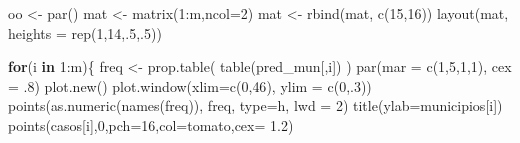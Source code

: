 \documentclass[
  letterpaper,
  DIV=11,
  numbers=noendperiod]{scrreprt}
\newenvironment{Shaded}{\begin{snugshade}}{\end{snugshade}}
\newcommand{\AttributeTok}[1]{\textcolor[rgb]{0.40,0.45,0.13}{#1}}
\newcommand{\ControlFlowTok}[1]{\textcolor[rgb]{0.00,0.23,0.31}{\textbf{#1}}}
\newcommand{\DecValTok}[1]{\textcolor[rgb]{0.68,0.00,0.00}{#1}}
\newcommand{\FloatTok}[1]{\textcolor[rgb]{0.68,0.00,0.00}{#1}}
\newcommand{\FunctionTok}[1]{\textcolor[rgb]{0.28,0.35,0.67}{#1}}
\newcommand{\NormalTok}[1]{\textcolor[rgb]{0.00,0.23,0.31}{#1}}
\newcommand{\OtherTok}[1]{\textcolor[rgb]{0.00,0.23,0.31}{#1}}
\newcommand{\SpecialCharTok}[1]{\textcolor[rgb]{0.37,0.37,0.37}{#1}}
\newcommand{\StringTok}[1]{\textcolor[rgb]{0.13,0.47,0.30}{#1}}
\theoremstyle{definition}
\theoremstyle{definition}
\theoremstyle{plain}
\theoremstyle{remark}
\begin{document}
\begin{Shaded}
\begin{Highlighting}[]
\NormalTok{oo }\OtherTok{\textless{}{-}} \FunctionTok{par}\NormalTok{()}
\NormalTok{mat }\OtherTok{\textless{}{-}} \FunctionTok{matrix}\NormalTok{(}\DecValTok{1}\SpecialCharTok{:}\NormalTok{m,}\AttributeTok{ncol=}\DecValTok{2}\NormalTok{)}
\NormalTok{mat }\OtherTok{\textless{}{-}} \FunctionTok{rbind}\NormalTok{(mat, }\FunctionTok{c}\NormalTok{(}\DecValTok{15}\NormalTok{,}\DecValTok{16}\NormalTok{))}
\FunctionTok{layout}\NormalTok{(mat, }\AttributeTok{heights =} \FunctionTok{rep}\NormalTok{(}\DecValTok{1}\NormalTok{,}\DecValTok{14}\NormalTok{,.}\DecValTok{5}\NormalTok{,.}\DecValTok{5}\NormalTok{))}

\ControlFlowTok{for}\NormalTok{(i }\ControlFlowTok{in} \DecValTok{1}\SpecialCharTok{:}\NormalTok{m)\{}
\NormalTok{  freq }\OtherTok{\textless{}{-}} \FunctionTok{prop.table}\NormalTok{( }\FunctionTok{table}\NormalTok{(pred\_mun[,i]) )}
  \FunctionTok{par}\NormalTok{(}\AttributeTok{mar =} \FunctionTok{c}\NormalTok{(}\DecValTok{1}\NormalTok{,}\DecValTok{5}\NormalTok{,}\DecValTok{1}\NormalTok{,}\DecValTok{1}\NormalTok{), }\AttributeTok{cex =}\NormalTok{ .}\DecValTok{8}\NormalTok{)}
  \FunctionTok{plot.new}\NormalTok{()}
  \FunctionTok{plot.window}\NormalTok{(}\AttributeTok{xlim=}\FunctionTok{c}\NormalTok{(}\DecValTok{0}\NormalTok{,}\DecValTok{46}\NormalTok{), }\AttributeTok{ylim =} \FunctionTok{c}\NormalTok{(}\DecValTok{0}\NormalTok{,.}\DecValTok{3}\NormalTok{))}
  \FunctionTok{points}\NormalTok{(}\FunctionTok{as.numeric}\NormalTok{(}\FunctionTok{names}\NormalTok{(freq)), freq, }\AttributeTok{type=}\StringTok{\textquotesingle{}h\textquotesingle{}}\NormalTok{, }\AttributeTok{lwd =} \DecValTok{2}\NormalTok{)}
  \FunctionTok{title}\NormalTok{(}\AttributeTok{ylab=}\NormalTok{municipios[i])}
  \FunctionTok{points}\NormalTok{(casos[i],}\DecValTok{0}\NormalTok{,}\AttributeTok{pch=}\DecValTok{16}\NormalTok{,}\AttributeTok{col=}\StringTok{\textquotesingle{}tomato\textquotesingle{}}\NormalTok{,}\AttributeTok{cex=} \FloatTok{1.2}\NormalTok{)}
  

\end{Highlighting}
\end{Shaded}
\end{document}

